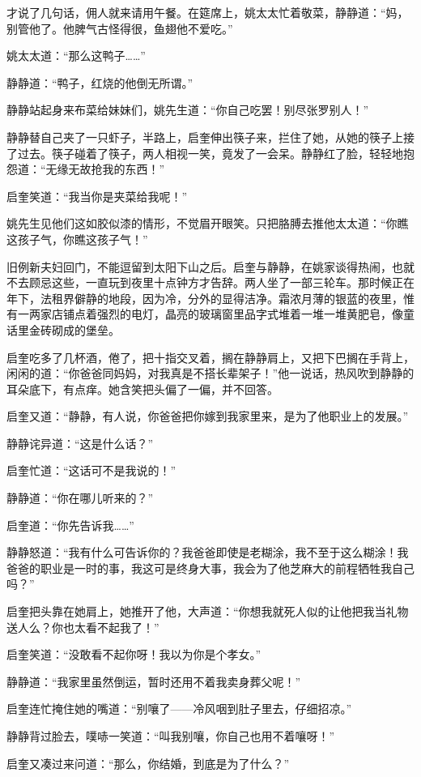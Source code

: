 \par 才说了几句话，佣人就来请用午餐。在筵席上，姚太太忙着敬菜，静静道：“妈，别管他了。他脾气古怪得很，鱼翅他不爱吃。”
\par 姚太太道：“那么这鸭子……”
\par 静静道：“鸭子，红烧的他倒无所谓。”
\par 静静站起身来布菜给妹妹们，姚先生道：“你自己吃罢！别尽张罗别人！”
\par 静静替自己夹了一只虾子，半路上，启奎伸出筷子来，拦住了她，从她的筷子上接了过去。筷子碰着了筷子，两人相视一笑，竟发了一会呆。静静红了脸，轻轻地抱怨道：“无缘无故抢我的东西！”
\par 启奎笑道：“我当你是夹菜给我呢！”
\par 姚先生见他们这如胶似漆的情形，不觉眉开眼笑。只把胳膊去推他太太道：“你瞧这孩子气，你瞧这孩子气！”
\par 旧例新夫妇回门，不能逗留到太阳下山之后。启奎与静静，在姚家谈得热闹，也就不去顾忌这些，一直玩到夜里十点钟方才告辞。两人坐了一部三轮车。那时候正在年下，法租界僻静的地段，因为冷，分外的显得洁净。霜浓月薄的银蓝的夜里，惟有一两家店铺点着强烈的电灯，晶亮的玻璃窗里品字式堆着一堆一堆黄肥皂，像童话里金砖砌成的堡垒。
\par 启奎吃多了几杯酒，倦了，把十指交叉着，搁在静静肩上，又把下巴搁在手背上，闲闲的道：“你爸爸同妈妈，对我真是不搭长辈架子！”他一说话，热风吹到静静的耳朵底下，有点痒。她含笑把头偏了一偏，并不回答。
\par 启奎又道：“静静，有人说，你爸爸把你嫁到我家里来，是为了他职业上的发展。”
\par 静静诧异道：“这是什么话？”
\par 启奎忙道：“这话可不是我说的！”
\par 静静道：“你在哪儿听来的？”
\par 启奎道：“你先告诉我……”
\par 静静怒道：“我有什么可告诉你的？我爸爸即使是老糊涂，我不至于这么糊涂！我爸爸的职业是一时的事，我这可是终身大事，我会为了他芝麻大的前程牺牲我自己吗？”
\par 启奎把头靠在她肩上，她推开了他，大声道：“你想我就死人似的让他把我当礼物送人么？你也太看不起我了！”
\par 启奎笑道：“没敢看不起你呀！我以为你是个孝女。”
\par 静静道：“我家里虽然倒运，暂时还用不着我卖身葬父呢！”
\par 启奎连忙掩住她的嘴道：“别嚷了——冷风咽到肚子里去，仔细招凉。”
\par 静静背过脸去，噗哧一笑道：“叫我别嚷，你自己也用不着嚷呀！”
\par 启奎又凑过来问道：“那么，你结婚，到底是为了什么？”
